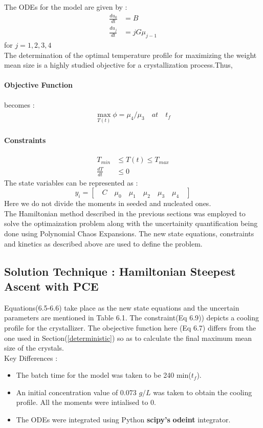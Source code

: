 \documentclass[3p,times,authoryear]{elsarticle}
\begin{document}
The ODEs for the model are given by :
\begin{align}
\frac{du_{0}}{dt} &= B \\
\frac{du_{j}}{dt} &= jG\mu_{j-1}
\end{align}
for  $j = 1,2,3,4 $ \\
The determination of the optimal temperature profile for maximizing the weight mean size is a highly studied objective for a crystallization process.Thus, 
\paragraph{Objective Function} becomes :
\begin{align}
\max_{T(t)}	\phi = \mu_{4}/\mu_{3} \quad at \quad t_{f} 
\end{align}
\paragraph{Constraints}
\begin{align}
T_{min} &\leqslant T(t) \leqslant T_{max} \\
\frac{dT}{dt} &\leqslant 0
\end{align}
The state variables can be represented as :
\begin{equation*}
y_{i} = \left[\quad C \quad \mu_{0} \quad \mu_{1} \quad \mu_{2} \quad \mu_{3}\quad \mu_{4} \quad\right]  
\end{equation*}
Here we do not divide the moments in seeded and nucleated ones.\\
The Hamiltonian method described in the previous sections was employed to solve the optimaization problem along with the uncertainity quantification being done using Polynomial Chaos Expansions. The new state equations, constraints and kinetics as described above are used to define the problem.\\

\subsection{Solution Technique : Hamiltonian Steepest Ascent with PCE}

Equations(6.5-6.6) take place as the new state equations and the uncertain parameters are mentioned in Table 6.1. The constraint(Eq 6.9)) depicts a cooling profile for the crystallizer. The obejective function here (Eq 6.7) differs from the one used in Section(\ref{deterministic}) so as to calculate the final maximum mean size of the crystals.\\ 
Key Differences :
\begin{itemize}
\item The batch time for the model was taken to be 240 min($t_{f}$).
\item An initial concentration value of 0.073 $g/L$ was taken to obtain the cooling profile. All the moments were intialised to 0.
\item The ODEs were integrated using Python \textbf{scipy's} \textbf{odeint} integrator.
\end{itemize}
\end{document}
